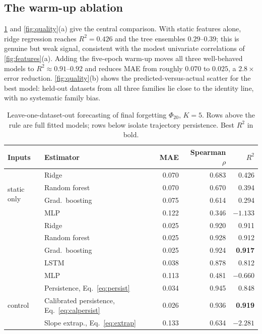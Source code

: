 \documentclass[manuscript,nonacm]{acmart}
\begin{document}
\subsection{The warm-up ablation}
\cref{tab:main} and \cref{fig:quality}(a) give the central comparison. With static
features alone, ridge regression reaches $R^2=0.426$ and the tree ensembles $0.29$--$0.39$;
this is genuine but weak signal, consistent with the modest univariate correlations of
\cref{fig:features}(a). Adding the five-epoch warm-up moves all three well-behaved
models to $R^2\approx0.91$--$0.92$ and reduces MAE from roughly $0.070$ to $0.025$,
a $2.8\times$ error reduction. \cref{fig:quality}(b) shows the predicted-versus-actual
scatter for the best model: held-out datasets from all three families lie close to the
identity line, with no systematic family bias.

\begin{table}[t]
\centering
\caption{Leave-one-dataset-out forecasting of final forgetting $\Phi_{20}$, $K=5$.
Rows above the rule are full fitted models; rows below isolate trajectory persistence.
Best $R^2$ in bold.}
\label{tab:main}
\begin{tabular}{llrrr}
\toprule
Inputs & Estimator & MAE & Spearman $\rho$ & $R^2$\\
\midrule
\multirow{4}{*}{static only}
 & Ridge          & 0.070 & 0.683 & 0.426\\
 & Random forest  & 0.070 & 0.670 & 0.394\\
 & Grad.\ boosting& 0.075 & 0.614 & 0.294\\
 & MLP            & 0.122 & 0.346 & $-1.133$\\
\addlinespace
\multirow{5}{*}{static $+$ warm-up}
 & Ridge          & 0.025 & 0.920 & 0.911\\
 & Random forest  & 0.025 & 0.928 & 0.912\\
 & Grad.\ boosting& 0.025 & 0.924 & \textbf{0.917}\\
 & LSTM           & 0.038 & 0.878 & 0.812\\
 & MLP            & 0.113 & 0.481 & $-0.660$\\
\midrule
\multirow{3}{*}{control}
 & Persistence, Eq.~\eqref{eq:persist}        & 0.034 & 0.945 & 0.848\\
 & Calibrated persistence, Eq.~\eqref{eq:calpersist} & 0.026 & 0.936 & \textbf{0.919}\\
 & Slope extrap., Eq.~\eqref{eq:extrap}       & 0.133 & 0.634 & $-2.281$\\
\bottomrule
\end{tabular}
\end{table}
\end{document}
